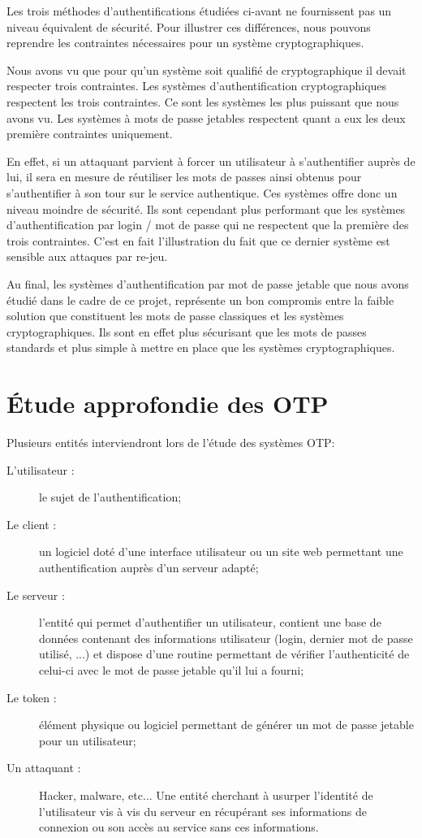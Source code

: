 	Les trois méthodes d'authentifications étudiées ci-avant ne fournissent pas un niveau
	équivalent de sécurité. Pour illustrer ces différences, nous pouvons reprendre les
	contraintes nécessaires pour un système cryptographiques. 
	
	Nous avons vu que pour qu'un système soit qualifié de cryptographique il devait 
	respecter trois contraintes. Les systèmes d'authentification cryptographiques respectent
	les trois contraintes. Ce sont les systèmes les plus puissant que nous avons vu. Les
	systèmes à mots de passe jetables respectent quant a eux les deux première contraintes
	uniquement.
	
	En effet, si un attaquant parvient à forcer un utilisateur à s'authentifier auprès de
	lui, il sera en mesure de réutiliser les mots de passes ainsi obtenus pour
	s'authentifier à son tour sur le service authentique. Ces systèmes offre donc un niveau
	moindre de sécurité. Ils sont cependant plus performant que les systèmes
	d'authentification par login / mot de passe qui ne respectent que la première des trois
	contraintes. C'est en fait l'illustration du fait que ce dernier système est sensible 
	aux attaques par re-jeu.
	
	Au final, les systèmes d'authentification par mot de passe jetable que nous avons étudié
	dans le cadre de ce projet, représente un bon compromis entre la faible solution que
	constituent les mots de passe classiques et les systèmes cryptographiques. Ils sont en 
	effet plus sécurisant que les mots de passes standards et plus simple à mettre en place
	que les systèmes cryptographiques.	

\section{Étude approfondie des OTP}

	Plusieurs entités interviendront lors de l'étude des systèmes OTP:
	
	\begin{description}
		\item[L'utilisateur :] le sujet de l'authentification;
		\item[Le client :] un logiciel doté d'une interface utilisateur ou un site 
		web permettant une authentification auprès d'un serveur adapté;
		\item[Le serveur :] l'entité qui permet d'authentifier un utilisateur, 
		contient une base de données contenant des informations utilisateur (login, 
		dernier mot de passe utilisé, ...) et dispose d'une routine permettant de 
		vérifier l'authenticité de celui-ci avec le mot de passe jetable qu'il lui a 
		fourni;
		\item[Le token :] élément physique ou logiciel permettant de générer un mot 
		de passe jetable pour un utilisateur;
		\item[Un attaquant :] Hacker, malware, etc... Une entité cherchant à usurper 
		l'identité de l'utilisateur vis à vis du serveur en récupérant ses 
		informations de connexion ou son accès au service sans ces informations.
	\end{description}


